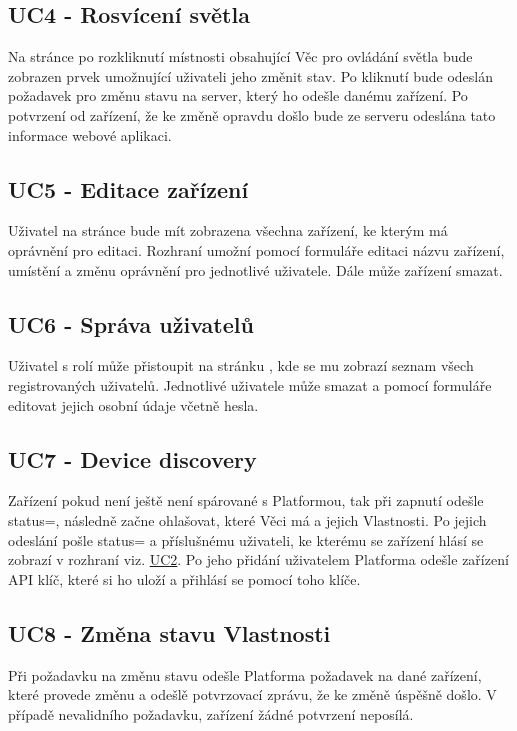 \subsection{UC4 - Rosvícení světla}
Na stránce  po rozkliknutí místnosti obsahující Věc pro ovládání světla  bude zobrazen prvek umožnující uživateli jeho změnit stav. Po kliknutí bude odeslán požadavek pro změnu stavu na server, který ho odešle danému zařízení. Po potvrzení od zařízení, že ke změně opravdu došlo bude ze serveru odeslána tato informace webové aplikaci.

\subsection{UC5 - Editace zařízení}
Uživatel na stránce  bude mít zobrazena všechna zařízení, ke kterým má oprávnění pro editaci. Rozhraní umožní pomocí formuláře editaci názvu zařízení, umístění a změnu oprávnění pro jednotlivé uživatele. Dále může zařízení smazat.

\subsection{UC6 - Správa uživatelů}
Uživatel s rolí  může přistoupit na stránku , kde se mu zobrazí seznam všech registrovaných uživatelů. Jednotlivé uživatele může smazat a pomocí formuláře editovat jejich osobní údaje včetně hesla.

\subsection{UC7 - Device discovery}
Zařízení pokud není ještě není spárované s Platformou, tak při zapnutí odešle status=, následně začne ohlašovat, které Věci má a jejich Vlastnosti. Po jejich odeslání pošle status= a příslušnému uživateli, ke kterému se zařízení hlásí se zobrazí v rozhraní viz. \hyperref[UC:UC2]{UC2}. Po jeho přidání uživatelem Platforma odešle zařízení API klíč, které si ho uloží a přihlásí se pomocí toho klíče.

\subsection{UC8 - Změna stavu Vlastnosti}
Při požadavku na změnu stavu  odešle Platforma požadavek na dané zařízení, které provede změnu a odešlě potvrzovací zprávu, že ke změně úspěšně došlo. V případě nevalidního požadavku, zařízení žádné potvrzení neposílá.



